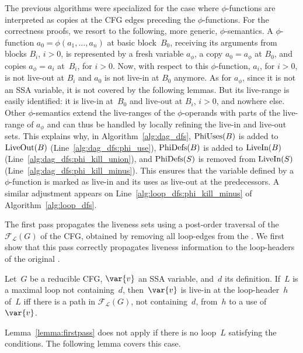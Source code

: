 The previous algorithms were specialized for the case where $\phi$-functions are interpreted as copies at the CFG edges preceding the $\phi$-functions.
For the correctness proofs, we resort to the following, more generic, $\phi$-semantics.
A $\phi$-function $a_0 = \phi(a_1, \ldots, a_n)$ at basic block~$B_0$, receiving its arguments from blocks $B_i$, $i>0$, is represented by a fresh variable $a_{\phi}$, a copy $a_0 = a_{\phi}$ at $B_0$, and copies $a_{\phi} = a_i$ at~$B_i$, for $i>0$.
Now, with respect to this $\phi$-function, $a_i$, for $i>0$, is not live-out at $B_i$ and $a_0$ is not live-in at $B_0$ anymore.
As for $a_{\phi}$, since it is not an SSA variable, it is not covered by the following lemmas.
But its live-range is easily identified:
it is live-in at~$B_0$ and live-out at $B_i$, $i>0$, and nowhere else.
Other $\phi$-semantics extend the live-ranges of the $\phi$-operands with parts of the live-range of $a_{\phi}$ and can thus be handled by locally refining the live-in and live-out sets.
This explains why, in Algorithm~\ref{alg:dag_dfs}, $\textrm{PhiUses}(B)$ is added to $\textrm{LiveOut}(B)$ (Line~\ref{alg:dag_dfs:phi_use}), $\textrm{PhiDefs}(B)$ is added to $\textrm{LiveIn}(B)$ (Line~\ref{alg:dag_dfs:phi_kill_union}), and $\textrm{PhiDefs}(S)$ is removed from $\textrm{LiveIn}(S)$ (Line~\ref{alg:dag_dfs:phi_kill_minus}).
This ensures that the variable defined by a $\phi$-function is marked as live-in and its uses as live-out at the predecessors.
A similar adjustment appears on Line~\ref{alg:loop_dfs:phi_kill_minus} of Algorithm~\ref{alg:loop_dfs}.



The first pass propagates the liveness sets using a post-order traversal of the \reducedGraph\ $\mathcal{F}_\mathcal{L}(G)$ of the CFG, obtained by removing all loop-edges from the \@CFG.
We first show that this pass correctly propagates liveness information to the loop-headers of the original \@CFG.
\begin{lemma}
	\label{lemma:firstpass}
	Let~$G$ be a reducible CFG, $\var{v}$ an SSA variable, and~$d$ its definition.
	If~$L$ is a maximal loop not containing~$d$, then~$\var{v}$ is live-in at the loop-header~$h$ of~$L$ iff there is a path in $\mathcal{F}_\mathcal{L}(G)$, not containing~$d$, from~$h$ to a use of $\var{v}$.
\end{lemma}


Lemma~\ref{lemma:firstpass} does not apply if there is no loop~$L$ satisfying the conditions.
The following lemma covers this case.

